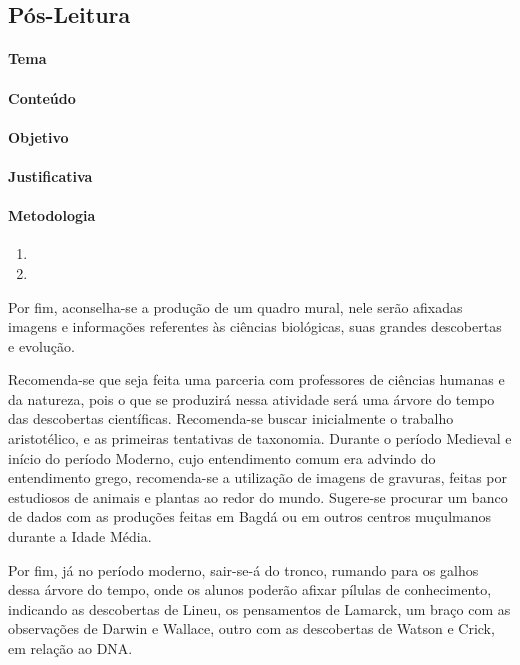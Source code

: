 \documentclass[12pt]{extarticle}
\begin{document}
\subsection{Pós-Leitura}

\paragraph{Tema}

\paragraph{Conteúdo}

\paragraph{Objetivo}

\paragraph{Justificativa}

\paragraph{Metodologia}

\begin{enumerate}

	\item

	\item

\end{enumerate}

Por fim, aconselha-se a produção de um quadro mural, nele serão afixadas
imagens e informações referentes às ciências biológicas, suas grandes
descobertas e evolução.

Recomenda-se que seja feita uma parceria com professores de ciências humanas
e da natureza, pois o que se produzirá nessa atividade será uma árvore do tempo
das descobertas científicas. Recomenda-se buscar inicialmente o trabalho
aristotélico, e as primeiras tentativas de taxonomia. Durante o período
Medieval e início do período Moderno, cujo entendimento comum era advindo do
entendimento grego, recomenda-se a utilização de imagens de gravuras, feitas
por estudiosos de animais e plantas ao redor do mundo. Sugere-se procurar um
banco de dados com as produções feitas em Bagdá ou em outros centros muçulmanos
durante a Idade Média.

Por fim, já no período moderno, sair-se-á do tronco, rumando para os galhos
dessa árvore do tempo, onde os alunos poderão afixar pílulas de conhecimento,
indicando as descobertas de Lineu, os pensamentos de Lamarck, um braço com as
observações de Darwin e Wallace, outro com as descobertas de Watson e Crick, em
relação ao DNA.
\end{document}
